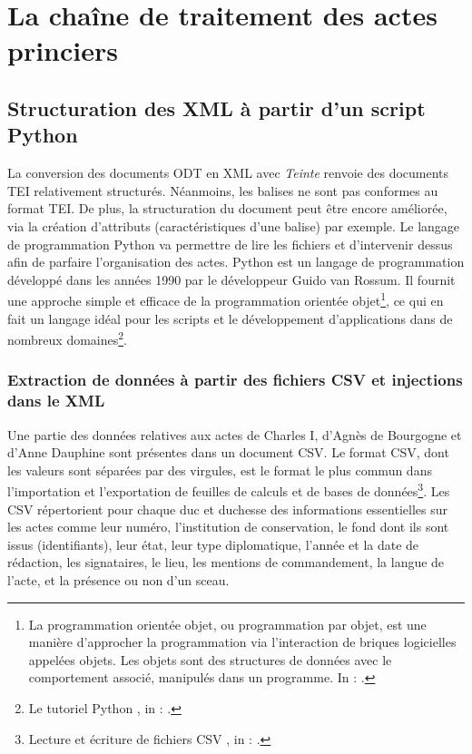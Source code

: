 \part{La chaîne de traitement des actes princiers}

\chapter[Structuration des XML]{Structuration des XML à partir d'un script Python}

\par La conversion des documents ODT en XML avec \textit{Teinte} renvoie des documents TEI relativement structurés. Néanmoins, les balises ne sont pas conformes au format TEI. De plus, la structuration du document peut être encore améliorée, via la création d'attributs (caractéristiques d'une balise) par exemple. Le langage de programmation Python va permettre de lire les fichiers et d'intervenir dessus afin de parfaire l'organisation des actes. Python est un langage de programmation développé dans les années 1990 par le développeur Guido van Rossum. Il fournit une approche simple et efficace de la programmation orientée objet\footnote{La programmation orientée objet, ou programmation par objet, est une manière d'approcher la programmation via l'interaction de briques logicielles appelées objets. Les objets sont des structures de données avec le comportement associé, manipulés dans un programme. In : \cite{ProgrammationOrienteeObjet2021}.}, ce qui en fait un langage idéal pour les scripts et le développement d’applications dans de nombreux domaines\footnote{\og Le tutoriel Python \fg, in : \cite{ContenuDocumentationPython}.}.



\newpage 

\section[Extraction / Injection des données]{Extraction de données à partir des fichiers CSV et injections dans le XML
}
\label{III.5.1}

\par Une partie des données relatives aux actes de Charles I, d’Agnès de Bourgogne et d’Anne Dauphine sont présentes dans un document CSV. Le format CSV, dont les valeurs sont séparées par des virgules, est le format le plus commun dans l'importation et l'exportation de feuilles de calculs et de bases de données\footnote{\og Lecture et écriture de fichiers CSV \fg, in : \cite{ContenuDocumentationPython}.}. Les CSV répertorient pour chaque duc et duchesse des informations essentielles sur les actes comme leur numéro, l'institution de conservation, le fond dont ils sont issus (identifiants), leur état, leur type diplomatique, l’année et la date de rédaction, les signataires, le lieu, les mentions de commandement, la langue de l'acte, et la présence ou non d’un sceau. 
\newline

